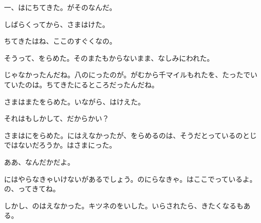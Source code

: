 一、はにちてきた。がそのなんだ。

しばらくってから、さまはけた。

ちてきたはね、ここのすぐくなの。

そうって、をらめた。そのまたもからないまま、なしみにわれた。

じゃなかったんだね。八のにったのが。がむから千マイルもれたを、たったでいていたのは。ちてきたにるところだったんだね。

さまはまたをらめた。いながら、はけえた。

それはもしかして、だからかい？

さまはにをらめた。にはえなかったが、をらめるのは、そうだとっているのとじではないだろうか。はさまにった。

ああ、なんだかだよ。

にはやらなきゃいけないがあるでしょう。のにらなきゃ。はここでっているよ。の、ってきてね。

しかし、のはえなかった。キツネのをいした。いらされたら、きたくなるもある。


